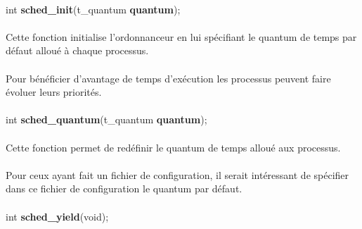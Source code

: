 \documentclass[10pt,a4wide]{article}
\begin{document}
\paragraph{}

\hspace{1.5cm}int \textbf{sched\_init}(t\_quantum \textbf{quantum});

\paragraph{}

Cette fonction initialise l'ordonnanceur en lui sp\'ecifiant le quantum
de temps par d\'efaut allou\'e \`a chaque processus.

\paragraph{}

Pour b\'en\'eficier d'avantage de temps d'ex\'ecution les processus
peuvent faire \'evoluer leurs priorit\'es.

\paragraph{}

\hspace{1.5cm}int \textbf{sched\_quantum}(t\_quantum \textbf{quantum});

\paragraph{}

Cette fonction permet de red\'efinir le quantum de temps allou\'e
aux processus.

\paragraph{}

Pour ceux ayant fait un fichier de configuration, il serait int\'eressant
de sp\'ecifier dans ce fichier de configuration le quantum par d\'efaut.

\paragraph{}

\hspace{1.5cm}int \textbf{sched\_yield}(void);

\paragraph{}
\end{document}
